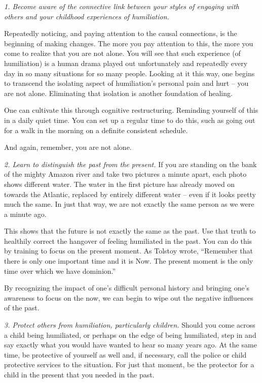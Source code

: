 \documentclass[]{book}
\begin{document}
\emph{1. Become aware of the connective link between your styles of engaging with others and your childhood experiences of humiliation.}

Repeatedly noticing, and paying attention to the causal connections, is the beginning of making changes. The more you pay attention to this, the more you come to realize that you are not alone. You will see that such experience (of humiliation) is a human drama played out unfortunately and repeatedly every day in so many situations for so many people. Looking at it this way, one begins to transcend the isolating aspect of humiliation's personal pain and hurt -- you are not alone. Eliminating that isolation is another foundation of healing.

One can cultivate this through cognitive restructuring. Reminding yourself of this in a daily quiet time. You can set up a regular time to do this, such as going out for a walk in the morning on a definite consistent schedule.

And again, remember, you are not alone.

\emph{2. Learn to distinguish the past from the present.} If you are standing on the bank of the mighty Amazon river and take two pictures a minute apart, each photo shows different water. The water in the first picture has already moved on towards the Atlantic, replaced by entirely different water -- even if it looks pretty much the same. In just that way, we are not exactly the same person as we were a minute ago.

This shows that the future is not exactly the same as the past. Use that truth to healthily correct the hangover of feeling humiliated in the past. You can do this by training to focus on the present moment. As Tolstoy wrote, ``Remember that there is only one important time and it is Now. The present moment is the only time over which we have dominion.''

By recognizing the impact of one's difficult personal history and bringing one's awareness to focus on the now, we can begin to wipe out the negative influences of the past.

\emph{3. Protect others from humiliation, particularly children.} Should you come across a child being humiliated, or perhaps on the edge of being humiliated, step in and say exactly what you would have wanted to hear so many years ago. At the same time, be protective of yourself as well and, if necessary, call the police or child protective services to the situation. For just that moment, be the protector for a child in the present that you needed in the past.
\end{document}
